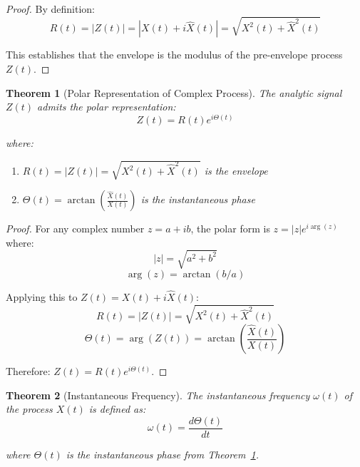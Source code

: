 \documentclass[11pt]{article}
\newtheorem{theorem}{Theorem}[section]
\begin{document}
\begin{proof}
By definition:
\begin{equation}
\label{eq:envelope_proof}
R(t) = |Z(t)| = |X(t) + i\hat{X}(t)| = \sqrt{X^2(t) + \hat{X}^2(t)}
\end{equation}

This establishes that the envelope is the modulus of the pre-envelope process $Z(t)$.
\end{proof}

\begin{theorem}[Polar Representation of Complex Process]
\label{thm:polar_representation}
The analytic signal $Z(t)$ admits the polar representation:
\begin{equation}
\label{eq:polar_rep}
Z(t) = R(t) e^{i\Theta(t)}
\end{equation}

where:
\begin{enumerate}
\item $R(t) = |Z(t)| = \sqrt{X^2(t) + \hat{X}^2(t)}$ is the envelope
\item $\Theta(t) = \arctan\left(\frac{\hat{X}(t)}{X(t)}\right)$ is the instantaneous phase
\end{enumerate}
\end{theorem}

\begin{proof}
For any complex number $z = a + ib$, the polar form is $z = |z|e^{i\arg(z)}$ where:
\begin{equation}
\label{eq:complex_modulus}
|z| = \sqrt{a^2 + b^2}
\end{equation}
\begin{equation}
\label{eq:complex_argument}
\arg(z) = \arctan(b/a)
\end{equation}

Applying this to $Z(t) = X(t) + i\hat{X}(t)$:
\begin{equation}
\label{eq:envelope_polar}
R(t) = |Z(t)| = \sqrt{X^2(t) + \hat{X}^2(t)}
\end{equation}
\begin{equation}
\label{eq:phase_polar}
\Theta(t) = \arg(Z(t)) = \arctan\left(\frac{\hat{X}(t)}{X(t)}\right)
\end{equation}

Therefore: $Z(t) = R(t) e^{i\Theta(t)}$.
\end{proof}

\begin{theorem}[Instantaneous Frequency]
\label{thm:instantaneous_frequency}
The instantaneous frequency $\omega(t)$ of the process $X(t)$ is defined as:
\begin{equation}
\label{eq:instantaneous_frequency_def}
\omega(t) = \frac{d\Theta(t)}{dt}
\end{equation}

where $\Theta(t)$ is the instantaneous phase from Theorem~\ref{thm:polar_representation}.
\end{theorem}
\end{document}
